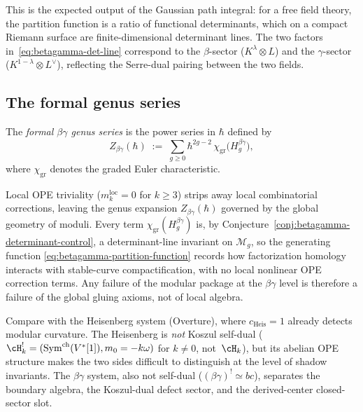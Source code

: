 \begin{remark}
\label{rem:betagamma-why-determinantal}
This is the expected output of the Gaussian path integral: for a free
field theory, the partition function is a ratio of functional
determinants, which on a compact Riemann surface are finite-dimensional
determinant lines. The two factors in~\eqref{eq:betagamma-det-line}
correspond to the $\beta$-sector ($K^\lambda \otimes L$) and the
$\gamma$-sector ($K^{1-\lambda} \otimes L^\vee$), reflecting the
Serre-dual pairing between the two fields.
\end{remark}

\subsection{The formal genus series}

\begin{definition}
\label{def:betagamma-holographic-partition-function}
The \emph{formal $\beta\gamma$ genus series} is the power series in
$\hbar$ defined by
\begin{equation}\label{eq:betagamma-partition-function}
 Z_{\beta\gamma}(\hbar)
 \;:=\;
 \sum_{g \geq 0} \hbar^{2g-2}\,
 \chi_{\mathrm{gr}}\bigl(H_g^{\beta\gamma}\bigr),
\end{equation}
where $\chi_{\mathrm{gr}}$ denotes the graded Euler characteristic.
\end{definition}

\begin{remark}
\label{rem:betagamma-holographic-atom-principle}
Local OPE triviality ($m_k^{\mathrm{loc}} = 0$ for
$k \geq 3$) strips away local combinatorial corrections, leaving the genus expansion
$Z_{\beta\gamma}(\hbar)$ governed by the global geometry of
moduli. Every term $\chi_{\mathrm{gr}}(H_g^{\beta\gamma})$ is, by
Conjecture~\ref{conj:betagamma-determinant-control}, a determinant-line
invariant on $\mathcal{M}_g$, so the generating function
\eqref{eq:betagamma-partition-function} records how
factorization homology interacts with stable-curve compactification,
with no local nonlinear OPE correction terms. Any failure of the modular
package at the $\beta\gamma$ level is therefore a failure of the
global gluing axioms, not of local algebra.

Compare with the Heisenberg system (Overture), where
$c_{\mathrm{Heis}} = 1$ already detects modular curvature. The
Heisenberg is \emph{not} Koszul self-dual
($\cH_k^!=(\mathrm{Sym}^{\mathrm{ch}}(V^*[1]),m_0=-k\omega)$
for \(k\ne0\), not~$\cH_k$),
but its abelian OPE structure makes the two sides difficult to
distinguish at the level of shadow invariants. The $\beta\gamma$
system, also not self-dual ($(\beta\gamma)^{!} \simeq bc$),
separates the boundary algebra, the Koszul-dual defect sector, and
the derived-center closed-sector slot.
\end{remark}


